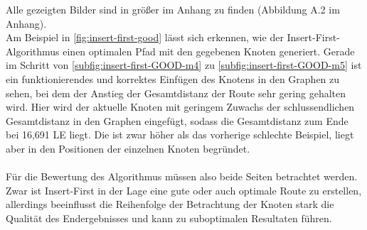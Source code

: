 Alle gezeigten Bilder sind in größer im Anhang zu finden (Abbildung A.2 im Anhang).\\
Am Beispiel in \vref{fig:insert-first-good} lässt sich erkennen, wie der Insert-First-Algorithmus einen optimalen Pfad mit den gegebenen Knoten generiert. 
Gerade im Schritt von \vref{subfig:insert-first-GOOD-m4} zu \vref{subfig:insert-first-GOOD-m5} ist ein funktionierendes und korrektes Einfügen des Knotens in den Graphen zu sehen, bei dem der Anstieg der Gesamtdistanz der Route sehr gering gehalten wird. 
Hier wird der aktuelle Knoten mit geringem Zuwachs der schlussendlichen Gesamtdistanz in den Graphen eingefügt, sodass die Gesamtdistanz zum Ende bei 16,691 \ac{LE} liegt.
Die ist zwar höher als das vorherige schlechte Beispiel, liegt aber in den Positionen der einzelnen Knoten begründet.
\\\\
Für die Bewertung des Algorithmus müssen also beide Seiten betrachtet werden. 
Zwar ist Insert-First in der Lage eine gute oder auch optimale Route zu erstellen, allerdings beeinflusst die Reihenfolge der Betrachtung der Knoten stark die Qualität des Endergebnisses und kann zu suboptimalen Resultaten führen.


